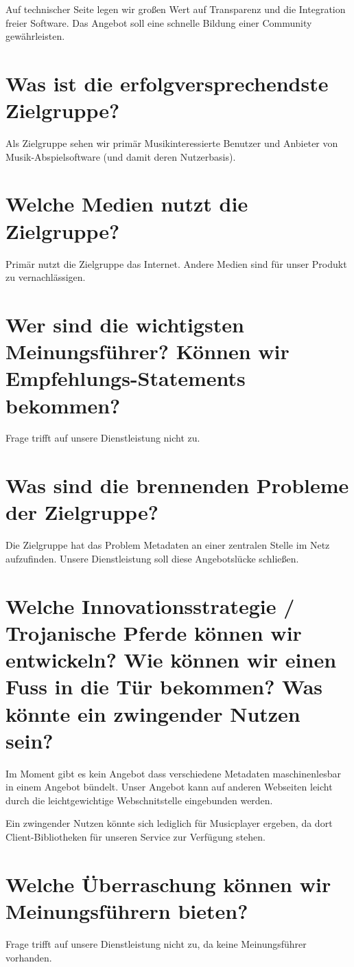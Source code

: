 \documentclass[11pt]{scrreprt}
\begin{document}
Auf technischer Seite legen wir großen Wert auf Transparenz und die Integration
freier Software. Das Angebot soll eine schnelle Bildung einer Community
gewährleisten.



\section{Was ist die erfolgversprechendste Zielgruppe?}
Als Zielgruppe sehen wir primär Musikinteressierte Benutzer und Anbieter von
Musik-Abspielsoftware (und damit deren Nutzerbasis).


\section{Welche Medien nutzt die Zielgruppe?}
Primär nutzt die Zielgruppe das Internet. Andere Medien sind für unser Produkt
zu vernachlässigen.


\section{Wer sind die wichtigsten Meinungsführer?
Können wir Empfehlungs-Statements bekommen?}
Frage trifft auf unsere Dienstleistung nicht zu.



\section{Was sind die brennenden Probleme der
Zielgruppe?}
Die Zielgruppe hat das Problem Metadaten an einer zentralen Stelle im Netz
aufzufinden. Unsere Dienstleistung soll diese Angebotslücke schließen.


\section{Welche Innovationsstrategie / Trojanische Pferde können wir entwickeln?
Wie können wir einen Fuss in die Tür bekommen?
Was könnte ein zwingender Nutzen sein?}
Im Moment gibt es kein Angebot dass verschiedene Metadaten maschinenlesbar 
in einem Angebot bündelt. Unser Angebot kann auf anderen Webseiten leicht durch
die leichtgewichtige Webschnitstelle eingebunden werden.

Ein zwingender Nutzen könnte sich lediglich für Musicplayer ergeben, da dort 
Client-Bibliotheken für unseren Service zur Verfügung stehen. 

\section{Welche Überraschung können wir
Meinungsführern bieten?}
Frage trifft auf unsere Dienstleistung nicht zu, da keine Meinungsführer
vorhanden.
\end{document}

